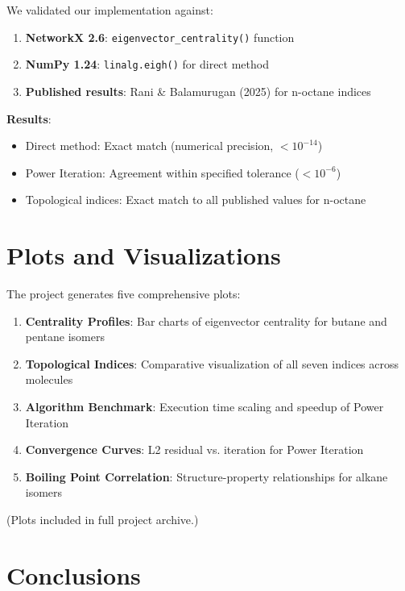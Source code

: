 \documentclass[12pt]{article}
\begin{document}
We validated our implementation against:

\begin{enumerate}
    \item \textbf{NetworkX 2.6}: \texttt{eigenvector\_centrality()} function
    \item \textbf{NumPy 1.24}: \texttt{linalg.eigh()} for direct method
    \item \textbf{Published results}: Rani \& Balamurugan (2025) for n-octane indices
\end{enumerate}

\textbf{Results}:

\begin{itemize}
    \item Direct method: Exact match (numerical precision, $< 10^{-14}$)
    \item Power Iteration: Agreement within specified tolerance ($< 10^{-6}$)
    \item Topological indices: Exact match to all published values for n-octane
\end{itemize}

\section{Plots and Visualizations}

The project generates five comprehensive plots:

\begin{enumerate}
    \item \textbf{Centrality Profiles}: Bar charts of eigenvector centrality for butane and pentane isomers
    \item \textbf{Topological Indices}: Comparative visualization of all seven indices across molecules
    \item \textbf{Algorithm Benchmark}: Execution time scaling and speedup of Power Iteration
    \item \textbf{Convergence Curves}: L2 residual vs. iteration for Power Iteration
    \item \textbf{Boiling Point Correlation}: Structure-property relationships for alkane isomers
\end{enumerate}

(Plots included in full project archive.)

\section{Conclusions}
\end{document}
